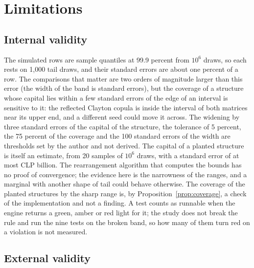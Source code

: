 \section{Limitations}
\label{sec:limitations}

\subsection{Internal validity}
\label{sec:limits-internal}

The simulated rows are sample quantiles at 99.9 percent from $10^6$ draws, so each rests on 1,000 tail draws, and their standard
errors are about one percent of a row. The comparisons that matter are two orders of magnitude larger than this error (the width
of the band is \bdWidthOverSe{} standard errors), but the coverage of a structure whose capital lies within a few standard errors of
the edge of an interval is sensitive to it: the reflected Clayton copula is inside the interval of both matrices near its upper end,
and a different seed could move it across. The widening by three standard errors of the capital of the structure, the tolerance of
5 percent, the 75 percent of the coverage and the 100 standard errors of the width are thresholds set by the author and not derived. The capital of a planted structure is itself an estimate, from 20 samples of $10^6$ draws, with a
standard error of at most CLP \bdTruthSeMax{} billion. The rearrangement algorithm that computes the bounds has no proof of
convergence; the evidence here is the narrowness of the ranges, and a marginal with another shape of tail could behave otherwise.
The coverage of the planted structures by the sharp range is, by Proposition~\ref{prop:coverage}, a check of the implementation and
not a finding. A test counts as runnable when the engine returns a green, amber or red light for it; the study does not break the rule and run the nine tests on the
broken band, so how many of them turn red on a violation is not measured.

\subsection{External validity}
\label{sec:limits-external}

